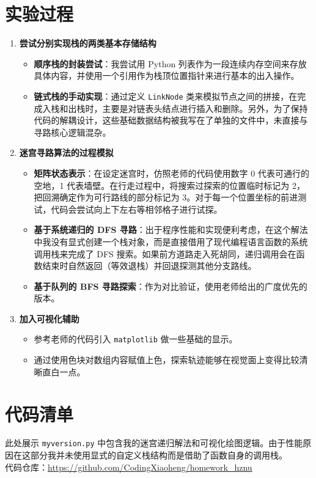 \documentclass[12pt,a4paper]{ctexart}
\begin{document}
	\section{实验过程}
	\begin{enumerate}
		\item \textbf{尝试分别实现栈的两类基本存储结构} 
		\begin{itemize}
			\item \textbf{顺序栈的封装尝试}：我尝试用 Python 列表作为一段连续内存空间来存放具体内容，并使用一个引用作为栈顶位置指针来进行基本的出入操作。
			\item \textbf{链式栈的手动实现}：通过定义 \texttt{LinkNode} 类来模拟节点之间的拼接，在完成入栈和出栈时，主要是对链表头结点进行插入和删除。另外，为了保持代码的解耦设计，这些基础数据结构被我写在了单独的文件中，未直接与寻路核心逻辑混杂。
		\end{itemize}
		
		\item \textbf{迷宫寻路算法的过程模拟}
		\begin{itemize}
			\item \textbf{矩阵状态表示}：在设定迷宫时，仿照老师的代码使用数字 0 代表可通行的空地，1 代表墙壁。在行走过程中，将搜索过探索的位置临时标记为 2，把回溯确定作为可行路线的部分标记为 3。对于每一个位置坐标的前进测试，代码会尝试向上下左右等相邻格子进行试探。
			\item \textbf{基于系统递归的 DFS 寻路}：出于程序性能和实现便利考虑，在这个解法中我没有显式创建一个栈对象，而是直接借用了现代编程语言函数的系统调用栈来完成了 DFS 搜索。如果前方道路走入死胡同，递归调用会在函数结束时自然返回（等效退栈）并回退探测其他分支路线。
			\item \textbf{基于队列的 BFS 寻路探索}：作为对比验证，使用老师给出的广度优先的版本。
		\end{itemize}
		
		\item \textbf{加入可视化辅助}
		\begin{itemize}
			\item 参考老师的代码引入 \texttt{matplotlib} 做一些基础的显示。
			\item 通过使用色块对数组内容赋值上色，探索轨迹能够在视觉面上变得比较清晰直白一点。
		\end{itemize}
	\end{enumerate}
	
	\section{代码清单}
	\noindent 此处展示 \texttt{myversion.py} 中包含我的迷宫递归解法和可视化绘图逻辑。由于性能原因在这部分我并未使用显式的自定义栈结构而是借助了函数自身的调用栈。\\
	代码仓库：\url{https://github.com/CodingXiaoheng/homework_hznu}
	
\end{document}
